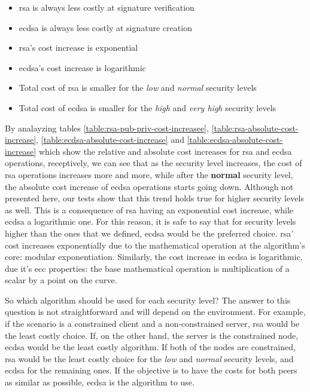 \documentclass{llncs}
\begin{document}
\begin{itemize}
  \item \gls{rsa} is always less costly at signature verification
  \item \gls{ecdsa} is always less costly at signature creation
  \item \gls{rsa}'s cost increase is exponential
  \item \gls{ecdsa}'s cost increase is logarithmic
  \item Total cost of \gls{rsa} is smaller for the \textit{low} and \textit{normal} security levels
  \item Total cost of \gls{ecdsa} is smaller for the \textit{high} and \textit{very high} security levels
\end{itemize}

By analayzing tables \ref{table:rsa-pub-priv-cost-increasee}, \ref{table:rsa-absolute-cost-increase}, \ref{table:ecdsa-absolute-cost-increase} and
\ref{table:ecdsa-absolute-cost-increase} which show the relative and absolute cost increases for \gls{rsa} and \gls{ecdsa} operations, receptively,
we can see that as the security level increases, the cost of \gls{rsa} operations increases more and more, while after the \textbf{normal} security
level, the absolute cost increase of \gls{ecdsa} operations starts going down. Although not presented here, our tests show that this trend holds true
for higher security levels as well. This is a consequence of \gls{rsa} having an exponential cost increase, while \gls{ecdsa} a logarithmic one.
For this reason, it is safe to say that for security levels higher than the ones that we defined, \gls{ecdsa} would be the preferred choice.
\gls{rsa}' cost increases exponentially due to the mathematical operation at the algorithm's core: modular exponentiation. Similarly, the cost
increase in \gls{ecdsa} is logarithmic, due it's \gls{ecc} properties: the base mathematical operation is multiplication of a scalar by a point on the
curve.

So which algorithm should be used for each security level? The answer to this question is not straightforward and will depend on the environment.
For example, if the scenario is a constrained client and a non-constrained server, \gls{rsa} would be the least costly choice. If, on the
other hand, the server is the constrained node, \gls{ecdsa} would be the least costly algorithm. If both of the nodes are
constrained, \gls{rsa} would be the least costly choice for the \textit{low} and \textit{normal} security levels, and \gls{ecdsa} for the remaining ones.
If the objective is  to have the costs for both peers as similar as possible, \gls{ecdsa} is the algorithm to use.
\end{document}
